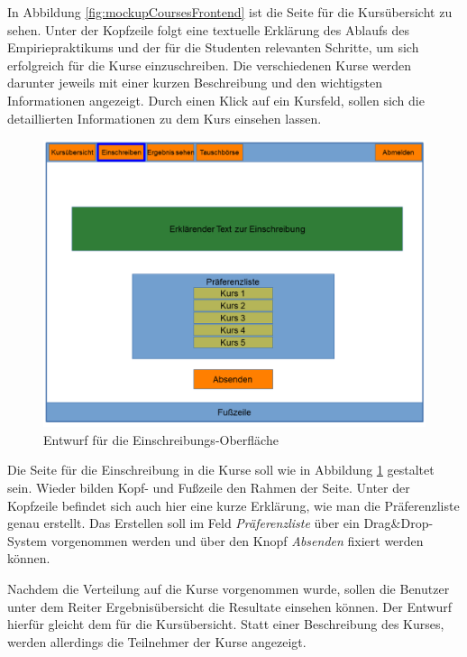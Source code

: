 			In Abbildung \ref{fig:mockupCoursesFrontend} ist die Seite für die Kursübersicht zu sehen.
            Unter der Kopfzeile folgt eine textuelle Erklärung des Ablaufs des Empiriepraktikums und der für die Studenten relevanten Schritte, um sich erfolgreich für die Kurse einzuschreiben.
            Die verschiedenen Kurse werden darunter jeweils mit einer kurzen Beschreibung und den wichtigsten Informationen angezeigt.
            Durch einen Klick auf ein Kursfeld, sollen sich die detaillierten Informationen zu dem Kurs einsehen lassen.
            
            \begin{figure}[t]
            	\centering
            	\includegraphics[width=\textwidth]{./design/images/MockUpsFrontend/frontendPreferences.png}
            	\caption{Entwurf für die Einschreibungs-Oberfläche}
            	\label{fig:mockupPreferencesFrontend}
            \end{figure}
            
            Die Seite für die Einschreibung in die Kurse soll wie in Abbildung \ref{fig:mockupPreferencesFrontend} gestaltet sein.
            Wieder bilden Kopf- und Fußzeile den Rahmen der Seite.
            Unter der Kopfzeile befindet sich auch hier eine kurze Erklärung, wie man die Präferenzliste genau erstellt.
            Das Erstellen soll im Feld \textit{Präferenzliste} über ein \glqq Drag\&Drop\grqq -System vorgenommen werden und über den Knopf \textit{Absenden} fixiert werden können.
            
            Nachdem die Verteilung auf die Kurse vorgenommen wurde, sollen die Benutzer unter dem Reiter Ergebnisübersicht die Resultate einsehen können.
            Der Entwurf hierfür gleicht dem für die Kursübersicht.
            Statt einer Beschreibung des Kurses, werden allerdings die Teilnehmer der Kurse angezeigt.
            
